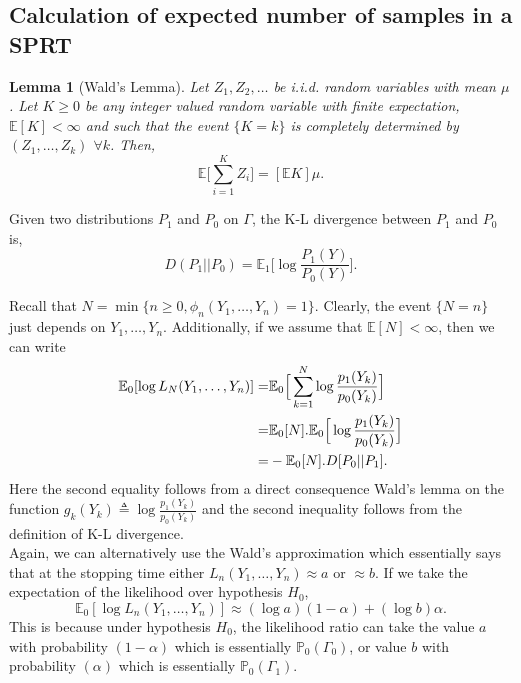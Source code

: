 \documentclass[a4paper,english,12pt]{article}
\newtheorem{lemma}[theorem]{Lemma}
\newenvironment{definition}[1][Definition]{\begin{trivlist}
\item[\hskip \labelsep {\bfseries #1}]}{\end{trivlist}}
\begin{document}
\subsection{Calculation of expected number of samples in a SPRT}
\begin{lemma}[Wald's Lemma]
Let $Z_1, Z_2, \ldots$ be i.i.d. random variables with mean $ \mu $. Let $K\geq 0$ be any integer valued random variable with finite expectation, $ \mathbb{E}[K] < \infty $ and such that the event $ \{K=k\} $ is completely determined by $(Z_1,\ldots, Z_k)$ $\forall k$. Then,
\begin{equation}
\mathbb{E}\Big[\sum_{i=1}^{K}Z_i\Big] = [\mathbb{E}K]\mu.
\end{equation}
\end{lemma}
\begin{definition}[K-L divergence] Given two distributions $ P_1 $ and $ P_0 $ on $ \Gamma $, the K-L divergence between $ P_1 $ and $ P_0 $ is,
\begin{equation*}
D(P_1||P_0) = \mathbb{E}_1\Big[ \log{\frac{P_1(Y)}{P_0(Y)}}\Big].
\end{equation*}
\end{definition}
\par Recall that $N = \min\{n\geq 0, \phi_n(Y_1,\ldots,Y_n)=1\}.$ Clearly, the event $\{N=n\}$ just depends on $Y_1,\ldots, Y_n.$ Additionally, if we assume that $\mathbb{E}[N]<\infty$, then we can write
\begin{eqnarray}
\notag\mathbb{E}_0[\log L_N(Y_1,\ldots, Y_n)] = & \mathbb{E}_0\Big[\sum_{k=1}^{N}\log \frac{p_1(Y_k)}{p_0(Y_k)}\Big]\\
\notag=& \mathbb{E}_0[N].\mathbb{E}_0\Big[\log \frac{p_1(Y_k)}{p_0(Y_k)}\Big]\\
=& -\mathbb{E}_0[N].D[P_0||P_1].
\end{eqnarray}
Here the second equality follows from a direct consequence Wald's lemma on the function $g_k(Y_k)\triangleq \log\frac{p_1(Y_k)}{p_0(Y_k)}$ and the second inequality follows from the definition of K-L divergence.\\
Again, we can alternatively use the Wald's approximation which essentially says that at the stopping time either $L_n(Y_1,\ldots,Y_n) \approx a \text{ or } \approx b$. If we take the expectation of the likelihood over hypothesis $H_0$,
\begin{equation}
\mathbb{E}_0[\log L_n(Y_1,\ldots,Y_n)] \approx (\log a)(1-\alpha) + (\log b)\alpha.
\end{equation}
This is because under hypothesis $H_0$, the likelihood ratio can take the  value $a$ with probability $(1-\alpha)$ which is essentially $\mathbb{P}_0(\Gamma_0)$, or value $b$ with probability $(\alpha)$ which is essentially $\mathbb{P}_0(\Gamma_1)$.\\
\end{document}
